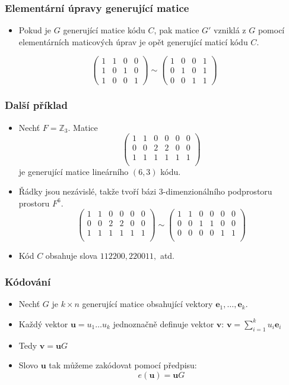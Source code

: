 \documentclass{beamer}
\newcommand{\vu}{\textbf{u}}
\newcommand{\vv}{\textbf{v}}
\newcommand{\e}{\textbf{e}}
\newenvironment{itemizex}%
  {\large \begin{itemize}%
    \setlength{\itemsep}{8pt}%
    \setlength{\parskip}{8pt}}%
  {\end{itemize}}
\newenvironment{itemize4}%
  {\large \begin{itemize}%
    \setlength{\itemsep}{4pt}%
    \setlength{\parskip}{4pt}}%
  {\end{itemize}}
\begin{document}
\begin{frame}[t,fragile]\frametitle{Elementární úpravy generující matice} 
    \begin{itemizex}
        \item Pokud je $G$ generující matice kódu $C$, pak matice $G'$ vzniklá z $G$ pomocí elementárních maticových úprav je opět generující maticí kódu $C$.
    \end{itemizex}

    $$
\begin{pmatrix}
1&1&0&0\\
1&0&1&0\\
1&0&0&1
\end{pmatrix}
\sim
\begin{pmatrix}
1&0&0&1\\
0&1&0&1\\
0&0&1&1
\end{pmatrix}
    $$
\end{frame}

\begin{frame}[t,fragile]\frametitle{Další příklad} 
    \begin{itemize4}
        \item Nechť $F=\mathbb{Z}_3$. Matice
        $$
\begin{pmatrix}
1&1&0&0&0&0\\
0&0&2&2&0&0\\
1&1&1&1&1&1\\
\end{pmatrix}
        $$
        je generující matice lineárního $(6,3)$ kódu.
        \item Řádky jsou nezávislé, takže tvoří bázi 3-dimenzionálního podprostoru prostoru $F^6$.
        $$
\begin{pmatrix}
1&1&0&0&0&0\\
0&0&2&2&0&0\\
1&1&1&1&1&1\\
\end{pmatrix}
\sim
\begin{pmatrix}
1&1&0&0&0&0\\
0&0&1&1&0&0\\
0&0&0&0&1&1\\
\end{pmatrix}
        $$
        \item Kód $C$ obsahuje slova $112200, 220011,$ atd.
    \end{itemize4}
\end{frame}


\begin{frame}[t,fragile]\frametitle{Kódování} 
    \begin{itemizex}
        \item Nechť $G$ je $k\times n$ generující matice obsahující vektory $\e_1,\dots,\e_k$. 
        \item Každý vektor $\vu=u_1\dots u_k$ jednoznačně definuje vektor $\vv$: $\vv=\sum_{i=1}^ku_i\e_i$
        \item Tedy $\vv=\vu G$
        \item Slovo $\vu$ tak můžeme zakódovat pomocí předpisu:
        $$
        e(\vu) = \vu G
        $$
    \end{itemizex}
\end{frame}
\end{document}
